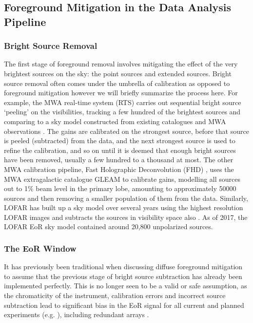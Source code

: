 \subsection{Foreground Mitigation in the Data Analysis Pipeline}
\subsubsection{Bright Source Removal}
The first stage of foreground removal involves mitigating the effect of the very brightest sources on the sky: the point sources and extended sources. Bright source removal often comes under the umbrella of calibration as opposed to foreground mitigation however we will briefly summarize the process here. For example, the MWA real-time system (RTS) \citep{Mitchell2008ISTSP...2..707M} carries out sequential bright source `peeling' on the visibilities, tracking a few hundred of the brightest sources and comparing to a sky model constructed from existing catalogues and MWA observations \citep{Carroll2016MNRAS.461.4151C}. The gains are calibrated on the strongest source, before that source is peeled (subtracted) from the data, and the next strongest source is used to refine the calibration, and so on until it is deemed that enough bright sources have been removed, usually a few hundred to a thousand at most. The other MWA calibration pipeline, Fast Holographic Deconvolution (FHD) \citep{Sullivan2012ApJ...759...17S}, uses the MWA extragalactic catalogue GLEAM \citep{HW2017MNRAS.464.1146H} to calibrate gains, modelling all sources out to 1$\%$ beam level in the primary lobe, amounting to approximately 50000 sources \citep{Barry2019arXiv190102980B} and then removing a smaller population of them from the data. Similarly, LOFAR has built up a sky model over several years using the highest resolution LOFAR images and subtracts the sources in visibility space also \citep{Yata2015MNRAS.449.4506Y,Yata2013A&A...550A.136Y}. As of 2017, the LOFAR EoR sky model contained around 20,800 unpolarized sources. 

\subsubsection{The EoR Window}
\label{sec:wedge}

It has previously been traditional when discussing diffuse foreground mitigation to assume that the previous stage of bright source subtraction has already been implemented perfectly. This is no longer seen to be a valid or safe assumption, as the chromaticity of the instrument, calibration errors and incorrect source subtraction lead to significant bias in the EoR signal for all current and planned experiments (e.g. \citet{ EW2017MNRAS.470.1849E,Procopio2017PASA...34...33P,Barry2016MNRAS.461.3135B,Patil2016MNRAS.463.4317P,Datta2010ApJ...724..526D,Liu2009MNRAS.394.1575L}), including redundant arrays \citep{Byrne2019ApJ...875...70B}. 


